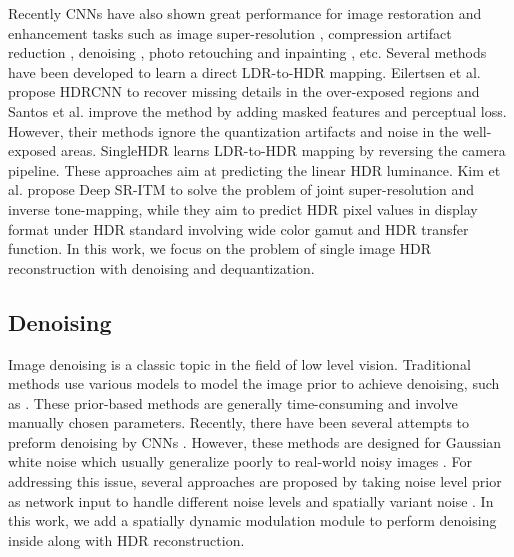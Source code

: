 \documentclass[final]{cvpr}
\begin{document}
Recently CNNs have also shown great performance for image restoration and enhancement tasks such as image super-resolution \cite{dong2014learning}, compression artifact reduction \cite{dong2015compression}, denoising \cite{zhang2017beyond}, photo retouching \cite{he2020conditional} and inpainting \cite{yeh2017semantic}, etc. Several methods have been developed to learn a direct LDR-to-HDR mapping. Eilertsen et al. \cite{eilertsen2017hdr} propose HDRCNN to recover missing details in the over-exposed regions and Santos et al. \cite{santos2020single} improve the method by adding masked features and perceptual loss. However, their methods ignore the quantization artifacts and noise in the well-exposed areas. SingleHDR \cite{liu2020single} learns LDR-to-HDR mapping by reversing the camera pipeline. These approaches aim at predicting the linear HDR luminance. Kim et al. \cite{kim2019deep} propose Deep SR-ITM to solve the problem of joint super-resolution and inverse tone-mapping, while they aim to predict HDR pixel values in display format under HDR standard involving wide color gamut and HDR transfer function. In this work, we focus on the problem of single image HDR reconstruction with denoising and dequantization.

\subsection{Denoising}
Image denoising is a classic topic in the field of low level vision. Traditional methods use various models to model the image prior to achieve denoising, such as \cite{dabov2007image, mairal2009non, dong2012nonlocally, gu2014weighted, weiss2007makes}. These prior-based methods are generally time-consuming and involve manually chosen parameters. Recently, there have been several attempts to preform denoising by CNNs \cite{zhang2017beyond, plotz2018neural, mao2016image}. However, these methods are designed for Gaussian white noise which usually generalize poorly to real-world noisy images \cite{plotz2017benchmarking}. For addressing this issue, several approaches are proposed by taking noise level prior as network input to handle different noise levels and spatially variant noise \cite{zhang2018ffdnet, he2019modulating, he2019interactive}. In this work, we add a spatially dynamic modulation module to perform denoising inside along with HDR reconstruction.
\end{document}
